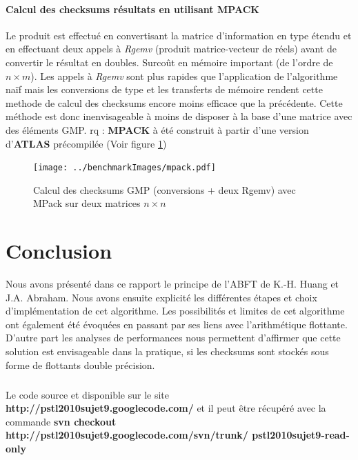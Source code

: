 \documentclass[a4paper, 10pt]{report}
\begin{document}
\subsubsection{Calcul des checksums résultats en utilisant \textbf{MPACK} \cite{MPACK}}
Le produit est effectué en convertisant la matrice d'information en type étendu et en effectuant deux appels à \textit{Rgemv} (produit matrice-vecteur de réels)
avant de convertir le résultat en doubles.\newline
Surco\^ut en mémoire important (de l'ordre de $n \times m$).\newline
Les appels à \textit{Rgemv} sont plus rapides que l'application de l'algorithme naïf mais les conversions de type et les
transferts de mémoire rendent cette methode de calcul des checksums encore moins efficace que la précédente.\newline
Cette méthode est donc inenvisageable à moins de disposer à la base d'une matrice avec des éléments GMP.\newline
rq : \textbf{MPACK} \cite{MPACK} à été construit à partir d'une version d'\textbf{ATLAS} \cite{ATLAS} précompilée\newline
(Voir figure \ref{fig:mpack})
\begin{figure}
\center
\texttt{[image: ../benchmarkImages/mpack.pdf]}
\caption{Calcul des checksums GMP (conversions + deux Rgemv) avec MPack sur deux matrices $n \times n$}
\label{fig:mpack}
\end{figure}


\chapter*{Conclusion}
Nous avons présenté dans ce rapport le principe de l'ABFT \cite{Huang} de K.-H. Huang et J.A. Abraham. Nous avons ensuite explicité les différentes étapes et choix
d'implémentation de cet algorithme.
Les possibilités et limites de cet algorithme ont également été évoquées en passant par ses liens avec l'arithmétique flottante.
D'autre part les analyses de performances nous permettent d'affirmer que cette solution est envisageable dans la pratique, si les checksums sont stockés sous forme de flottants double précision.
\paragraph*{}
Le code source et disponible sur le site \textbf{http://pstl2010sujet9.googlecode.com/} et il peut \^etre récupéré avec la commande\newline
\textbf{svn checkout http://pstl2010sujet9.googlecode.com/svn/trunk/ pstl2010sujet9-read-only}
\end{document}
